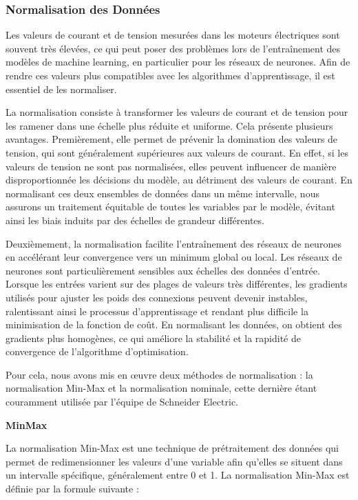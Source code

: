 \subsubsection{Normalisation des Données}

Les valeurs de courant et de tension mesurées dans les moteurs électriques sont
souvent très élevées, ce qui peut poser des problèmes lors de l'entraînement
des modèles de machine learning, en particulier pour les réseaux de neurones.
Afin de rendre ces valeurs plus compatibles avec les algorithmes
d'apprentissage, il est essentiel de les normaliser.

La normalisation consiste à transformer les valeurs de courant et de tension
pour les ramener dans une échelle plus réduite et uniforme. Cela présente
plusieurs avantages. Premièrement, elle permet de prévenir la domination des
valeurs de tension, qui sont généralement supérieures aux valeurs de courant.
En effet, si les valeurs de tension ne sont pas normalisées, elles peuvent
influencer de manière disproportionnée les décisions du modèle, au détriment
des valeurs de courant. En normalisant ces deux ensembles de données dans un
même intervalle, nous assurons un traitement équitable de toutes les variables
par le modèle, évitant ainsi les biais induits par des échelles de grandeur
différentes.

Deuxièmement, la normalisation facilite l'entraînement des réseaux de neurones
en accélérant leur convergence vers un minimum global ou local. Les réseaux de
neurones sont particulièrement sensibles aux échelles des données d'entrée.
Lorsque les entrées varient sur des plages de valeurs très différentes, les
gradients utilisés pour ajuster les poids des connexions peuvent devenir
instables, ralentissant ainsi le processus d'apprentissage et rendant plus
difficile la minimisation de la fonction de coût. En normalisant les données,
on obtient des gradients plus homogènes, ce qui améliore la stabilité et la
rapidité de convergence de l'algorithme d'optimisation.

Pour cela, nous avons mis en œuvre deux méthodes de normalisation : la
normalisation Min-Max et la normalisation nominale, cette dernière étant
couramment utilisée par l'équipe de Schneider Electric.

\textbf{MinMax}

La normalisation Min-Max est une technique de prétraitement des données qui
permet de redimensionner les valeurs d'une variable afin qu'elles se situent
dans un intervalle spécifique, généralement entre 0 et 1. La normalisation
Min-Max est définie par la formule suivante :

